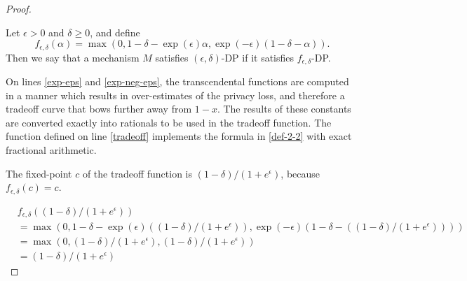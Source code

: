 \documentclass{article}
\begin{document}
\begin{proof} 

\begin{definition}
    \label{def-2-2}
    Let $\epsilon > 0$ and $\delta \geq 0$, and define 
    \begin{equation}
        f_{\epsilon,\delta}(\alpha) = \max(0, 1 - \delta - \exp(\epsilon) \alpha, \exp(-\epsilon) (1 - \delta - \alpha)).
    \end{equation}
    Then we say that a mechanism $M$ satisfies $(\epsilon, \delta)$-DP if it satisfies $f_{\epsilon,\delta}$-DP.
\end{definition}

On lines \ref{exp-eps} and \ref{exp-neg-eps}, 
the transcendental functions are computed in a manner which results in over-estimates of the privacy loss, 
and therefore a tradeoff curve that bows further away from $1 - x$.
The results of these constants are converted exactly into rationals to be used in the tradeoff function.
The function defined on line \ref{tradeoff} implements the formula in \ref{def-2-2} with exact fractional arithmetic.

The fixed-point $c$ of the tradeoff function is $(1 - \delta) / (1 + e^\epsilon)$, because $f_{\epsilon,\delta}(c) = c$.

\begin{align}
    &f_{\epsilon,\delta}((1 - \delta) / (1 + e^\epsilon)) \\
    &= \max(0, 1 - \delta - \exp(\epsilon) ((1 - \delta) / (1 + e^\epsilon)), \exp(-\epsilon) (1 - \delta - ((1 - \delta) / (1 + e^\epsilon)))) \\
    &= \max(0, (1 - \delta) / (1 + e^\epsilon), (1 - \delta) / (1 + e^\epsilon)) \\
    &= (1 - \delta) / (1 + e^\epsilon)
\end{align}

\end{proof}

\printbibliography
\end{document}

